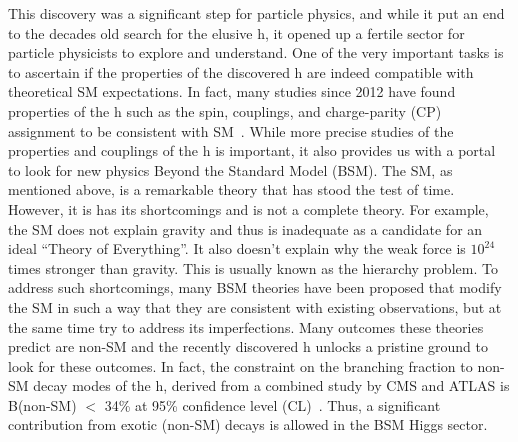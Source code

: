 This discovery was a significant step for particle physics, and while it put an end to the decades old search for the elusive h, it opened up a fertile sector for particle physicists to explore and understand. One of the very important tasks is to ascertain if the properties of the discovered h are indeed compatible with theoretical SM expectations. In fact, many studies since 2012 have found properties of the h such as the spin, couplings, and charge-parity (CP) assignment to be consistent with SM~\cite{JHEP2016:45}. While more precise studies of the properties and couplings of the h is important, it also provides us with a portal to look for new physics Beyond the Standard Model (BSM). The SM, as mentioned above, is a remarkable theory that has stood the test of time. However, it is has its shortcomings and is not a complete theory. For example, the SM does not explain gravity and thus is inadequate as a candidate for an ideal ``Theory of Everything''. It also doesn't explain why the weak force is $10^24$ times stronger than gravity. This is usually known as the hierarchy problem. To address such shortcomings, many BSM theories have been proposed that modify the SM in such a way that they are consistent with existing observations, but at the same time try to address its imperfections. Many outcomes these theories predict are non-SM and the recently discovered h unlocks a pristine ground to look for these outcomes. In fact, the constraint on the branching fraction to non-SM decay modes of the h, derived from a combined study by CMS and ATLAS is B(non-SM) $<$ 34\% at 95\% confidence level (CL)~\cite{JHEP2016:45}. Thus, a significant contribution from exotic (non-SM) decays is allowed in the BSM Higgs sector.

